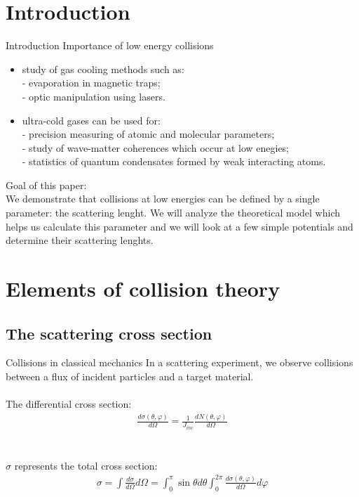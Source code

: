 \section{Introduction}
\begin{frame}{Introduction}
Importance of low energy collisions\\
\begin{itemize}
  \item study of gas cooling methods such as:\\
  - evaporation in magnetic traps;\\
  - optic manipulation using lasers.
  \item ultra-cold gases can be used for:\\
  - precision measuring of atomic and molecular parameters;\\
  - study of wave-matter coherences which occur at low enegies;\\
  - statistics of quantum condensates formed by weak interacting atoms.
\end{itemize}

Goal of this paper:\\
We demonstrate that collisions at low energies can be defined by a single parameter: the scattering lenght. We will analyze the theoretical model which helps us calculate this parameter and we will look at a few simple potentials and determine their scattering lenghts. 
\end{frame}

\section{Elements of collision theory}

\subsection{The scattering cross section}

\begin{frame}{Collisions in classical mechanics}
In a scattering experiment, we observe collisions between a flux of incident particles and a target material.\\~\\

The differential cross section:
\begin{align}
\frac{d\sigma(\theta,\varphi)}{d\Omega}=\frac{1}{J_{inc}}\frac{dN(\theta,\varphi)}{d\Omega} 
\end{align}
\\~\\
$\sigma$ represents the total cross section: 
\begin{align}
\sigma=\int\frac{d\sigma}{d\Omega}d\Omega=\int_{0}^{\pi}\sin\theta d\theta\int_{0}^{2\pi}\frac{d\sigma(\theta,\varphi)}{d\Omega}d\varphi
\end{align} 
\end{frame}

